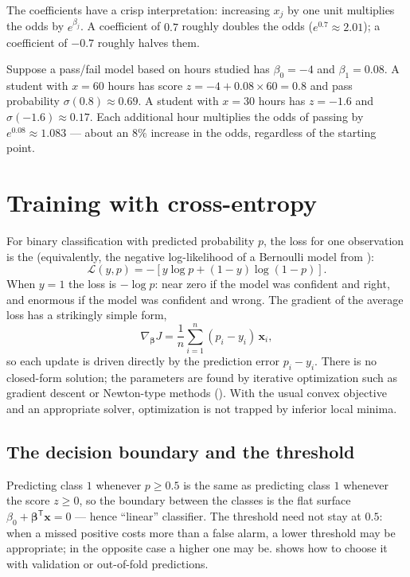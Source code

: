 The coefficients have a crisp interpretation: increasing $x_j$ by one unit multiplies the odds by $e^{\beta_j}$. A coefficient of $0.7$ roughly doubles the odds ($e^{0.7}\approx 2.01$); a coefficient of $-0.7$ roughly halves them.

\begin{workedexample}
Suppose a pass/fail model based on hours studied has $\beta_0=-4$ and $\beta_1=0.08$.
A student with $x=60$ hours has score $z=-4+0.08\times 60=0.8$ and pass probability $\sigma(0.8)\approx 0.69$.
A student with $x=30$ hours has $z=-1.6$ and $\sigma(-1.6)\approx 0.17$.
Each additional hour multiplies the odds of passing by $e^{0.08}\approx 1.083$ --- about an $8\%$ increase in the odds, regardless of the starting point.
\end{workedexample}

\section{Training with cross-entropy}

For binary classification with predicted probability $p$, the loss for one observation is the  (equivalently, the negative log-likelihood of a Bernoulli model from ):
\[
  \mathcal{L}(y,p)
  =-[y\log p+(1-y)\log(1-p)].
\]
When $y=1$ the loss is $-\log p$: near zero if the model was confident and right, and enormous if the model was confident and wrong. The gradient of the average loss has a strikingly simple form,
\[
  \nabla_{\bm{\beta}}J
  =\frac{1}{n}\sum_{i=1}^{n}(p_i-y_i)\,\bm{x}_i,
\]
so each update is driven directly by the prediction error $p_i-y_i$. There is no closed-form solution; the parameters are found by iterative optimization such as gradient descent or Newton-type methods (). With the usual convex objective and an appropriate solver, optimization is not trapped by inferior local minima.

\subsection{The decision boundary and the threshold}

Predicting class $1$ whenever $p\geq 0.5$ is the same as predicting class $1$ whenever the score $z\geq 0$, so the boundary between the classes is the flat surface $\beta_0+\bm{\beta}^{\mathsf T}\bm{x}=0$ --- hence ``linear'' classifier. The threshold need not stay at $0.5$: when a missed positive costs more than a false alarm, a lower threshold may be appropriate; in the opposite case a higher one may be.  shows how to choose it with validation or out-of-fold predictions.

